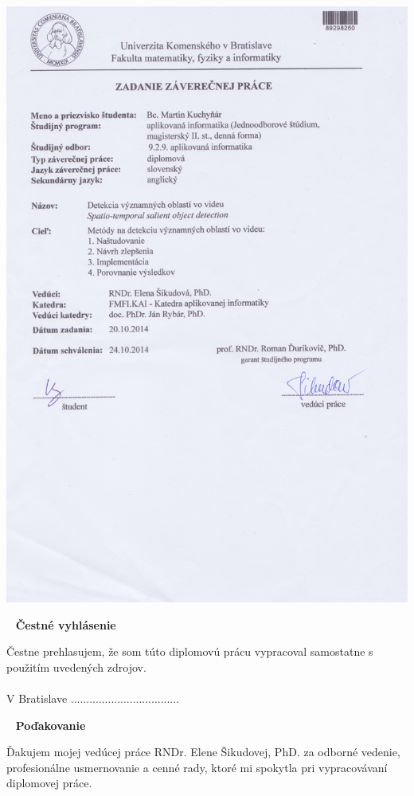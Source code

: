 \newpage
\thispagestyle{empty}
\vspace*{-35px}\hspace*{-30px}
\includegraphics[scale=0.2]{pics/zadanie.jpeg}

\newpage
{~}\vfill
{\noindent \large\bf Čestné vyhlásenie}
\vspace{1.5cm}

Čestne prehlasujem, že som túto diplomovú prácu vypracoval samostatne s použitím uvedených zdrojov.\\\\
V Bratislave
\hfill ...................................
\vspace{1cm}

\newpage
{~}\vfill
{\noindent\large\bf Poďakovanie}
\vspace{1.5cm}

Ďakujem mojej vedúcej práce RNDr. Elene Šikudovej, PhD. za odborné vedenie, profesionálne usmernovanie a cenné rady, ktoré mi spokytla pri vypracovávaní diplomovej práce. \\
\vspace{1cm}

\newpage
